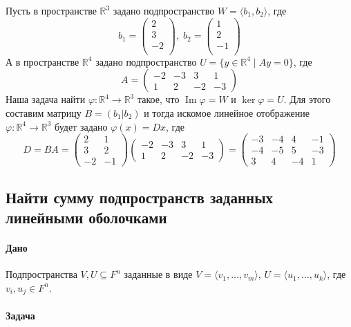 \documentclass{article}
\renewcommand{\Im}{\operatorname{Im}}
\begin{document}
Пусть в пространстве $\mathbb R^3$ задано подпространство $W = \langle b_1, b_2\rangle$, где
\[
b_1 = \begin{pmatrix}
{2}\\
{3}\\
{-2}\\
\end{pmatrix},\;
b_2 = \begin{pmatrix}
{1}\\
{2}\\
{-1}\\
\end{pmatrix}
\]
А в пространстве $\mathbb R^4$ задано подпространство $U = \{y\in \mathbb R^4\mid Ay = 0\}$, где
\[
A = 
\begin{pmatrix}
-2&-3&3&1\\
1&2&-2&-3
\end{pmatrix}
\]
Наша задача найти $\varphi \colon \mathbb R^4\to \mathbb R^3$ такое, что $\Im \varphi = W$ и $\ker \varphi = U$. Для этого составим матрицу $B = (b_1|b_2)$ и тогда искомое линейное отображение $\varphi \colon \mathbb R^4\to \mathbb R^3$ будет задано $\varphi(x) = Dx$, где
\[
D = BA =
\begin{pmatrix}
2&1\\
3&2\\
-2&-1
\end{pmatrix}
\begin{pmatrix}
-2&-3&3&1\\
1&2&-2&-3
\end{pmatrix}
=
\begin{pmatrix}
-3&-4&4&-1\\
-4&-5&5&-3\\
3&4&-4&1
\end{pmatrix}
\]


\subsection{Найти сумму подпространств заданных линейными оболочками}

\paragraph{Дано}

Подпространства $V,U\subseteq F^{n}$ заданные в виде $V = \langle v_1,\ldots,v_m\rangle$, $U = \langle u_1,\ldots,u_k\rangle$, где $v_i,u_j\in F^{n}$.

\paragraph{Задача}
\end{document}
